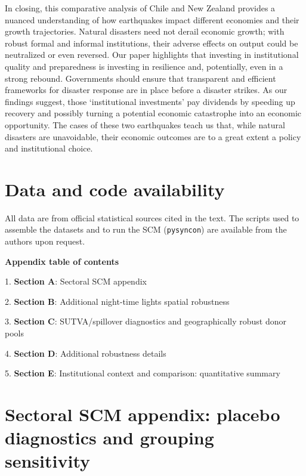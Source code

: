 \documentclass[12pt]{article}
\begin{document}
In closing, this comparative analysis of Chile and New Zealand provides a nuanced understanding of how earthquakes impact different economies and their growth trajectories. Natural disasters need not derail economic growth; with robust formal and informal institutions, their adverse effects on output could be neutralized or even reversed. Our paper highlights that investing in institutional quality and preparedness is investing in resilience and, potentially, even in a strong rebound. Governments should ensure that transparent and efficient frameworks for disaster response are in place before a disaster strikes. As our findings suggest, those ‘institutional investments’ pay dividends by speeding up recovery and possibly turning a potential economic catastrophe into an economic opportunity. The cases of these two earthquakes teach us that, while natural disasters are unavoidable, their economic outcomes are to a great extent a policy and institutional choice.

\newpage

\printbibliography
\section*{Data and code availability}
All data are from official statistical sources cited in the text. The scripts used to assemble the datasets and to run the SCM (\texttt{pysyncon}) are available from the authors upon request.

\newpage

\textbf{Appendix table of contents}


1. \textbf{Section A}: Sectoral SCM appendix

2. \textbf{Section B}: Additional night-time lights spatial robustness

3. \textbf{Section C}: SUTVA/spillover diagnostics and geographically robust donor pools

4. \textbf{Section D}: Additional robustness details 

5. \textbf{Section E}: Institutional context and comparison: quantitative summary 


\newpage
\appendix
\section{Sectoral SCM appendix: placebo diagnostics and grouping sensitivity}
\end{document}
